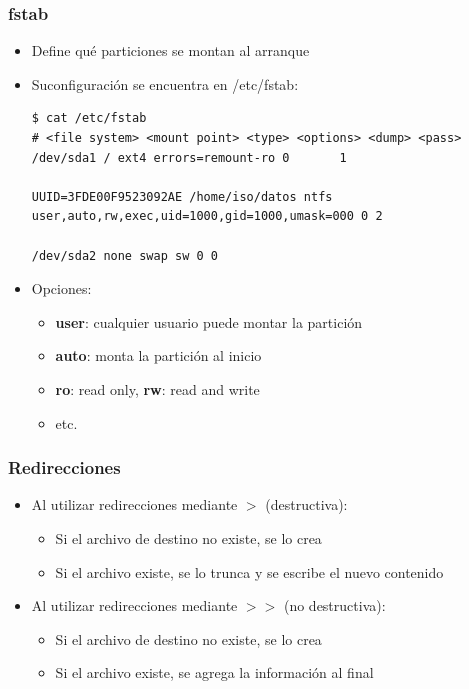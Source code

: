 \begin{frame}[fragile]
  	\frametitle{\textbf{fstab}}
  	\begin{itemize}
		\item Define qué particiones se montan al arranque
		\item Suconfiguración se encuentra en /etc/fstab:
		\begin{lstlisting}
$ cat /etc/fstab
# <file system> <mount point> <type> <options> <dump> <pass>
/dev/sda1 / ext4 errors=remount-ro 0       1

UUID=3FDE00F9523092AE /home/iso/datos ntfs user,auto,rw,exec,uid=1000,gid=1000,umask=000 0 2

/dev/sda2 none swap sw 0 0
		\end{lstlisting}
		\item Opciones:
		\begin{itemize}
			\item \textbf{user}: cualquier usuario puede montar la partición
			\item \textbf{auto}: monta la partición al inicio
			\item \textbf{ro}: read only, \textbf{rw}: read and write
			\item etc.
		\end{itemize}
  	\end{itemize}
\end{frame}

\begin{frame}
  	\frametitle{Redirecciones}
  	\begin{itemize}
		\item Al utilizar redirecciones mediante \textbf{$>$} (destructiva):
		\begin{itemize}
			\item Si el archivo de destino no existe, se lo crea
			\item Si el archivo existe, se lo trunca y se escribe el nuevo contenido
		\end{itemize}
		\item Al utilizar redirecciones mediante \textbf{$>>$} (no destructiva):
		\begin{itemize}
			\item Si el archivo de destino no existe, se lo crea
			\item Si el archivo existe, se agrega la información al final
		\end{itemize}
  	\end{itemize}
\end{frame}

